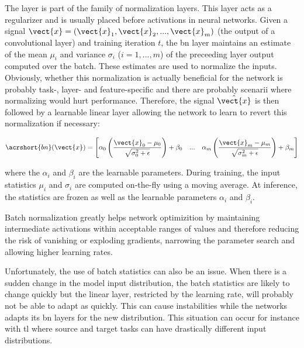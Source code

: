 The  \parencite{ioffe2015batch} layer is part of the family of normalization layers. This layer acts as a regularizer and is usually placed before activations in neural networks. Given a signal $\vect{x} = \left(\vect{x}_1, \vect{x}_2, ..., \vect{x}_m\right)$ (\eg the output of a convolutional layer) and training iteration $t$, the \acrshort{bn} layer maintains an estimate of the mean $\mu_i$ and variance $\sigma_i$ ($i = 1, ..., m$) of the preceeding layer output computed over the batch. These estimates are used to normalize the inputs. Obviously, whether this normalization is actually beneficial for the network is probably task-, layer- and feature-specific and there are probably scenarii where normalizing would hurt performance. Therefore, the signal $\hat{\vect{x}}$ is then followed by a learnable linear layer allowing the network to learn to revert this normalization if necessary:

\begin{equation}
\label{eqn:backml:bn}
\acrshort{bn}(\vect{x}) = \begin{bmatrix}
\alpha_0 \left(\dfrac{\vect{x}_0 - \mu_0}{\sqrt{\sigma^2_0 + \epsilon}}\right) + \beta_0 & ... & \alpha_m \left(\dfrac{\vect{x}_m - \mu_m}{\sqrt{\sigma^2_m + \epsilon}}\right) + \beta_m \\
\end{bmatrix}\end{equation} 

where the $\alpha_i$ and $\beta_i$ are the learnable parameters. During training, the input statistics $\mu_i$ and $\sigma_i$ are computed on-the-fly using a moving average. At inference, the statistics are frozen as well as the learnable parameters $\alpha_i$ and $\beta_i$.      
  
Batch normalization greatly helps network optimizition by maintaining intermediate activations within acceptable ranges of values and therefore reducing the risk of vanishing or exploding gradients, narrowing the parameter search and allowing higher learning rates. 

Unfortunately, the use of batch statistics can also be an issue. When there is a sudden change in the model input distribution, the batch statistics are likely to change quickly but the linear layer, restricted by the learning rate, will probably not be able to adapt as quickly. This can cause instabilities while the networks adapts its \acrlong{bn} layers for the new distribution. This situation can occur for instance with \acrlong{tl} where source and target tasks can have drastically different input distributions. 

